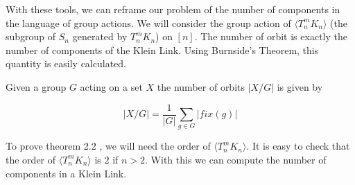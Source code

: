 \documentclass[12pt]{article}
\newenvironment{theorem}[2][Theorem]{\begin{trivlist}
\item[\hskip \labelsep {\bfseries #1}\hskip \labelsep {\bfseries #2.}]}{\end{trivlist}}
\begin{document}
With these tools, we can reframe our problem of the number of components in the language of group actions. We will consider the group action of $\langle T_n^m K_n \rangle$ (the subgroup of $S_n$ generated by $T_n^m K_n$) on $[n]$. The number of orbit is exactly the number of components of the Klein Link. Using Burnside's Theorem, this quantity is easily calculated.

\begin{theorem}{2.2}
Given a group $G$ acting on a set $X$ the number of orbits $|X/G|$ is given by

\begin{equation}
|X/G| = \frac{1}{|G|}\sum_{g\in G} |fix(g)|
\end{equation}
\end{theorem}

To prove theorem 2.2 , we will need the order of $\langle T_n^m K_n \rangle$. It is easy to check that the order of $\langle T_n^m K_n \rangle$ is $2$ if $n>2$. With this we can compute the number of components in a Klein Link.
\end{document}
